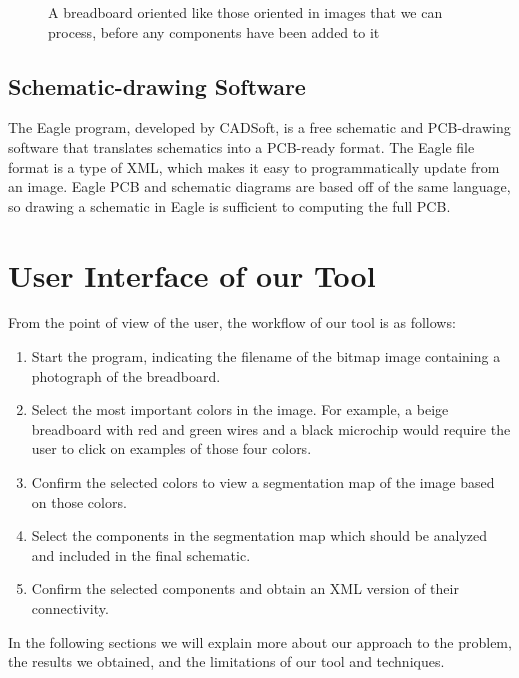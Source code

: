 \documentclass[10pt,twocolumn,letterpaper]{article}
\begin{document}
\begin{figure}[t]
\begin{center}
\end{center}
   \caption{A breadboard oriented like those oriented in images that
     we can process, before any components have been added to it}
\label{fig:board}
\end{figure}

\subsection{Schematic-drawing Software}

The Eagle program, developed by CADSoft, is a free schematic and PCB-drawing
software that translates schematics into a PCB-ready format. The Eagle file
format is a type of XML, which makes it easy to programmatically update from an
image. Eagle PCB and schematic diagrams are based off of the same language, so
drawing a schematic in Eagle is sufficient to computing the full PCB. 


\section{User Interface of our Tool}

From the point of view of the user, the workflow of our tool is as
follows:

\begin{enumerate}
\item Start the program, indicating the filename of the bitmap image
  containing a photograph of the breadboard.
\item Select the most important colors in the image. For example, a
  beige breadboard with red and green wires and a black microchip
  would require the user to click on examples of those four colors.
\item Confirm the selected colors to view a segmentation map of the image
  based on those colors.
\item Select the components in the segmentation map which should be
  analyzed and included in the final schematic.
\item Confirm the selected components and obtain an XML version of
  their connectivity.
\end{enumerate}

In the following sections we will explain more about our approach to
the problem, the results we obtained, and the limitations of our tool
and techniques.
\end{document}
